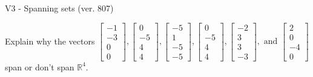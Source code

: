 \begin{exercise}
  \begin{exerciseTitle}V3 - Spanning sets (ver. 807)\end{exerciseTitle}
  \begin{exerciseStatement}
    Explain why the vectors \(\left[\begin{array}{r}
-1 \\
-3 \\
0 \\
0
\end{array}\right] , \left[\begin{array}{r}
0 \\
-5 \\
4 \\
4
\end{array}\right] , \left[\begin{array}{r}
-5 \\
1 \\
-5 \\
-5
\end{array}\right] , \left[\begin{array}{r}
0 \\
-5 \\
4 \\
4
\end{array}\right] , \left[\begin{array}{r}
-2 \\
3 \\
3 \\
-3
\end{array}\right] , \text{ and } \left[\begin{array}{r}
2 \\
0 \\
-4 \\
0
\end{array}\right]\) span or don't span \(\mathbb{R}^4\). 
	



\end{exerciseStatement}
\end{exercise}
